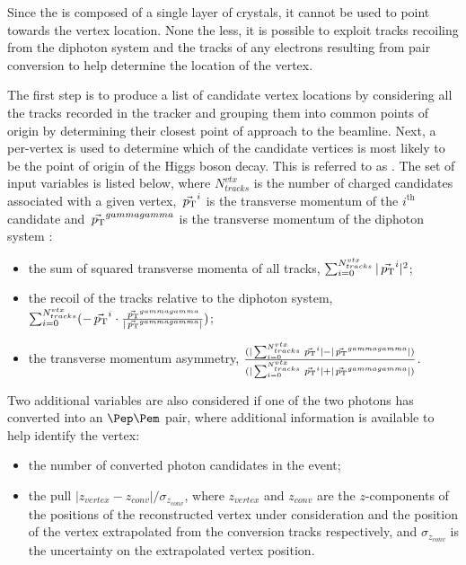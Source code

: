 Since the \CMS \ECAL is composed of a single layer of crystals, it cannot be used to point towards the vertex location. %
None the less, it is possible to exploit tracks recoiling from the diphoton system and the tracks of any electrons resulting from pair conversion to help determine the location of the vertex.

The first step is to produce a list of candidate vertex locations by considering all the tracks recorded in the tracker and grouping them into common points of origin by determining their closest point of approach to the beamline. Next, a per-vertex \BDT is used to determine which of the candidate vertices is most likely to be the point of origin of the Higgs boson decay. This \BDT is referred to as \VtxIdBdt. The set of input variables is listed below, where $N_{tracks}^{vtx}$ is the number of charged \PF candidates associated with a given vertex, $\vec{\,p_\text{T}}^i$ is the transverse momentum of the $i^{\textrm{th}}$ candidate and $\vec{\,p_\text{T}}^{gammagamma}$ is the transverse momentum of the diphoton system :
\begin{itemize}
\item the sum of squared transverse momenta of all tracks, $\sum_{i=0}^{N_{tracks}^{vtx}} | \vec{\,p_\text{T}}^{i} |^2$;
\item the recoil of the tracks relative to the diphoton system,  $\sum_{i=0}^{N_{tracks}^{vtx}} (- \vec{\,p_\text{T}}^i \cdot \frac{\vec{\,p_\text{T}}^{gammagamma}}{|\vec{\,p_\text{T}}^{gammagamma}| })$;
\item the transverse momentum asymmetry,  $\frac{(|\sum_{i=0}^{N_{tracks}^{vtx}} \vec{\,p_\text{T}}^i| - |\vec{\,p_\text{T}}^{gammagamma}|)}{(|\sum_{i=0}^{N_{tracks}^{vtx}} \vec{\,p_\text{T}}^i| + |\vec{\,p_\text{T}}^{gammagamma}|)}$.
\end{itemize}

Two additional variables are also considered if one of the two photons has converted into an $\Pep\Pem$ pair, where additional information is available to help identify the vertex:
\begin{itemize}
\item the number of converted photon candidates in the event;
\item the pull $|z_{vertex} - z_{conv}|/\sigma_{z_{conv}} $, where $z_{vertex}$ and $ z_{conv}$ are the $z$-components of the positions of the reconstructed vertex under consideration  and the position of the vertex extrapolated from the conversion tracks respectively, and $\sigma_{z_{conv}} $ is the uncertainty on the extrapolated vertex position.
\end{itemize}

